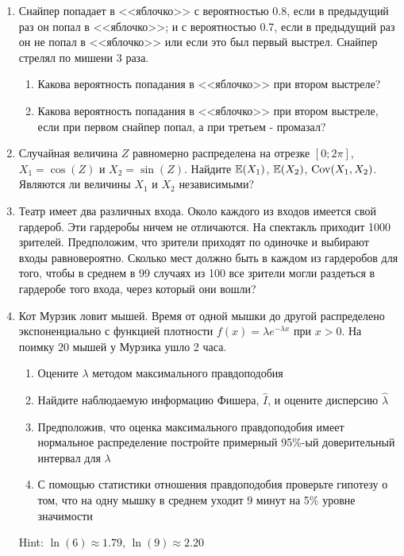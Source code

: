 \documentclass[pdftex,12pt,a4paper]{article}
\begin{document}
\begin{enumerate}

\item Снайпер попадает в <<яблочко>> с вероятностью 0.8, если в предыдущий раз он попал в <<яблочко>>; и с вероятностью 0.7, если в предыдущий раз он не попал в <<яблочко>> или если это был первый выстрел. Снайпер стрелял по мишени 3 раза. 
\begin{enumerate}
\item Какова вероятность попадания в <<яблочко>> при втором выстреле?
\item Какова вероятность попадания в <<яблочко>> при втором выстреле, если при первом снайпер попал, а при третьем - промазал?
\end{enumerate}

\item Случайная величина $Z$ равномерно распределена на отрезке  $[0;2\pi]$, $X_1=\cos(Z)$ и $X_2=\sin(Z)$. Найдите $\mathbb{E}(X_1)$, $\mathbb{E}(X_2)$, $\operatorname{Cov}(X_1,X_2)$. Являются ли величины $X_1$ и $X_2$ независимыми?

\item Театр имеет два различных входа. Около каждого из входов имеется свой гардероб. Эти гардеробы ничем не отличаются.  На спектакль приходит 1000 зрителей. Предположим, что зрители приходят по одиночке и выбирают входы равновероятно. Сколько мест должно быть в каждом из гардеробов для того, чтобы в среднем в 99 случаях из 100 все зрители могли раздеться в гардеробе того входа, через который они вошли? 

\item Кот Мурзик ловит мышей. Время от одной мышки до другой распределено экспоненциально с функцией плотности $f(x)=\lambda e^{-\lambda x}$ при $x>0$. На поимку 20 мышей у Мурзика ушло 2 часа. 
\begin{enumerate}
\item Оцените $\lambda$ методом максимального правдоподобия
\item Найдите наблюдаемую информацию Фишера, $\hat{I}$, и оцените дисперсию $\hat{\lambda}$
\item Предположив, что оценка максимального правдоподобия имеет нормальное распределение постройте примерный 95\%-ый доверительный интервал для $\lambda$
\item С помощью статистики отношения правдоподобия проверьте гипотезу о том, что на одну мышку в среднем уходит 9 минут на 5\% уровне значимости
\end{enumerate}

Hint: $\ln(6)\approx 1.79$, $\ln(9)\approx 2.20$



\end{enumerate}
\end{document}
